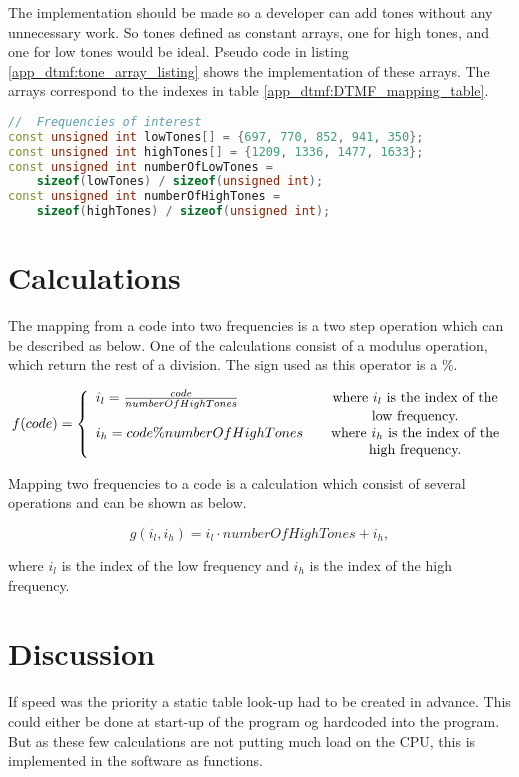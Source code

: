 The implementation should be made so a developer can add tones without any unnecessary work.	
 So tones defined as constant arrays, one for high tones, and one for low tones would be ideal. Pseudo code in listing \ref{app_dtmf:tone_array_listing} shows the implementation of these arrays. The arrays correspond to the indexes in table \ref{app_dtmf:DTMF_mapping_table}.
	
	\begin{lstlisting}[float=htb,language={C++},caption={Implementation of tone arrays},label={app_dtmf:tone_array_listing}]
//	Frequencies of interest
const unsigned int lowTones[] = {697, 770, 852, 941, 350};
const unsigned int highTones[] = {1209, 1336, 1477, 1633};
const unsigned int numberOfLowTones =
	sizeof(lowTones) / sizeof(unsigned int);
const unsigned int numberOfHighTones =
	sizeof(highTones) / sizeof(unsigned int);
	\end{lstlisting}
	
	\section{Calculations}
	The mapping from a code into two frequencies is a two step operation which can be described as below. One of the calculations consist of a modulus operation, which return the rest of a division. The sign used as this operator is a \%.
	
	\[
		f(code) = \left\{ 
		\begin{array}{l c}
			i_{l} = \frac{code}{numberOfHighTones} & \quad \text{where $i_{l}$ is the index of the}\\
			& \quad \text{low frequency.}\\
			i_{h} = code \% numberOfHighTones & \quad \text{where $i_{h}$ is the index of the}\\
						& \quad \text{high frequency.}\\
		\end{array} \right.
	\]
	
	Mapping two frequencies to a code is a calculation which consist of several operations and can be shown as below.
	
	\[
		g(i_{l}, i_{h}) = i_{l} \cdot numberOfHighTones + i_{h},
	\]
	
	where $i_{l}$ is the index of the low frequency and $i_{h}$ is the index of the high frequency.
	
	\section{Discussion}
	
If speed was the priority a static table look-up had to be created in advance. This could either be done at start-up of the program og hardcoded into the program. But as these few calculations are not putting much load on the CPU, this is implemented in the software as functions.